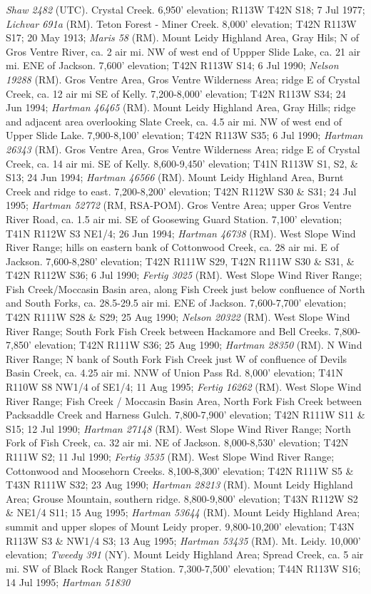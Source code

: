 \textit{Shaw 2482} (UTC).  Crystal Creek. 6,950' elevation; R113W T42N S18; 7 Jul 1977; \textit{Lichvar 691a} (RM).  Teton Forest - Miner Creek. 8,000' elevation; T42N R113W S17; 20 May 1913; \textit{Maris 58} (RM).  Mount Leidy Highland Area, Gray Hils; N of Gros Ventre River, ca. 2 air mi. NW of west end of Uppper Slide Lake, ca. 21 air mi. ENE of Jackson. 7,600' elevation; T42N R113W S14; 6 Jul 1990; \textit{Nelson 19288} (RM).  Gros Ventre Area, Gros Ventre Wilderness Area; ridge E of Crystal Creek, ca. 12 air mi SE of Kelly.  7,200-8,000' elevation; T42N R113W S34; 24 Jun 1994; \textit{Hartman 46465} (RM).  Mount Leidy Highland Area, Gray Hills; ridge and adjacent area overlooking Slate Creek, ca. 4.5 air mi. NW of west end of Upper Slide Lake. 7,900-8,100' elevation; T42N R113W S35; 6 Jul 1990; \textit{Hartman 26343} (RM).  Gros Ventre Area, Gros Ventre Wilderness Area; ridge E of Crystal Creek, ca. 14 air mi. SE of Kelly. 8,600-9,450' elevation; T41N R113W S1, S2, \& S13; 24 Jun 1994; \textit{Hartman 46566} (RM).  Mount Leidy Highland Area, Burnt Creek and ridge to east. 7,200-8,200' elevation; T42N R112W S30 \& S31; 24 Jul 1995; \textit{Hartman 52772} (RM, RSA-POM).  Gros Ventre Area; upper Gros Ventre River Road, ca. 1.5 air mi. SE of Goosewing Guard Station. 7,100' elevation; T41N R112W S3 NE1/4; 26 Jun 1994; \textit{Hartman 46738} (RM).  West Slope Wind River Range; hills on eastern bank of Cottonwood Creek, ca. 28 air mi. E of Jackson. 7,600-8,280' elevation; T42N R111W S29, T42N R111W S30 \& S31, \& T42N R112W S36; 6 Jul 1990; \textit{Fertig 3025} (RM).  West Slope Wind River Range; Fish Creek/Moccasin Basin area, along Fish Creek just below confluence of North and South Forks, ca. 28.5-29.5 air mi. ENE of Jackson. 7,600-7,700' elevation; T42N R111W S28 \& S29; 25 Aug 1990; \textit{Nelson 20322} (RM).  West Slope Wind River Range; South Fork Fish Creek between Hackamore and Bell Creeks. 7,800-7,850' elevation; T42N R111W S36; 25 Aug 1990; \textit{Hartman 28350} (RM).  N Wind River Range; N bank of South Fork Fish Creek just W of confluence of Devils Basin Creek, ca. 4.25 air mi. NNW of Union Pass Rd. 8,000' elevation; T41N R110W S8 NW1/4 of SE1/4; 11 Aug 1995; \textit{Fertig 16262} (RM).  West Slope Wind River Range; Fish Creek / Moccasin Basin Area, North Fork Fish Creek between Packsaddle Creek and Harness Gulch. 7,800-7,900' elevation; T42N R111W S11 \& S15; 12 Jul 1990; \textit{Hartman 27148} (RM).  West Slope Wind River Range; North Fork of Fish Creek, ca. 32 air mi. NE of Jackson. 8,000-8,530' elevation; T42N R111W S2; 11 Jul 1990; \textit{Fertig 3535} (RM).  West Slope Wind River Range; Cottonwood and Moosehorn Creeks. 8,100-8,300' elevation; T42N R111W S5 \& T43N R111W S32; 23 Aug 1990; \textit{Hartman 28213} (RM).  Mount Leidy Highland Area; Grouse Mountain, southern ridge. 8,800-9,800' elevation; T43N R112W S2 \& NE1/4 S11; 15 Aug 1995; \textit{Hartman 53644} (RM).  Mount Leidy Highland Area; summit and upper slopes of Mount Leidy proper. 9,800-10,200' elevation; T43N R113W S3 \& NW1/4 S3; 13 Aug 1995; \textit{Hartman 53435} (RM).  Mt. Leidy. 10,000' elevation; \textit{Tweedy 391} (NY).  Mount Leidy Highland Area; Spread Creek, ca. 5 air mi. SW of Black Rock Ranger Station. 7,300-7,500' elevation; T44N R113W S16; 14 Jul 1995; \textit{Hartman 51830} 